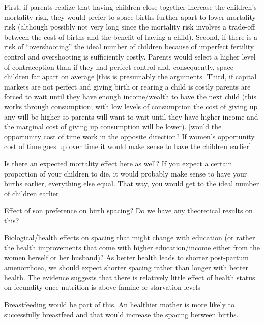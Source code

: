 First, if parents realize that having children close together increase the children's
mortality risk, they would prefer to space births further apart to lower mortality risk
(although possibly not very long since the mortality risk involves a trade-off between the
cost of births and the benefit of having a child).
Second, if there is a risk of ``overshooting'' the ideal number of children because of
imperfect fertility control and overshooting is sufficiently costly.
Parents would select a higher level of contraception than if they had perfect control and,
consequently, space children far apart on average [this is presumably
the \citep{Keyfitz1971,Heckman1976} arguments]
Third, if capital markets are not perfect and giving birth or rearing a child is costly
parents are forced to wait until they have enough income/wealth to have the next child
(this works through consumption; with low levels of consumption the cost of giving up
any will be higher so parents will want to wait until they have higher income and the
marginal cost of giving up consumption will be lower).
[would the opportunity cost of time work in the opposite direction? If women's 
opportunity cost of time goes up over time it would make sense to have the children
earlier]

Is there an expected mortality effect here as well?
If you expect a certain proportion of your children to die, it would probably make sense
to have your births earlier, everything else equal.
That way, you would get to the ideal number of children earlier.

Effect of son preference on birth spacing?
Do we have any theoretical results on this?

Biological/health effects on spacing that might change with education (or rather the
health improvements that come with higher education/income either from the women
herself or her husband)?
As better health leads to shorter post-partum amenorrhoea, we should expect shorter
spacing rather than longer with better health.
The evidence suggests that there is relatively little effect of health status on 
fecundity once nutrition is above famine or starvation levels \citep{Huffman1987,John1987,lindstrom99}


Breastfeeding would be part of this.
An healthier mother is more likely to successfully breastfeed and that would increase the
spacing between births.



